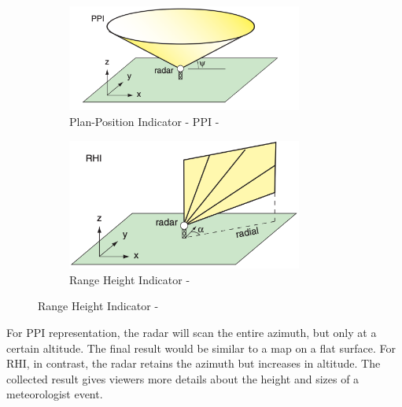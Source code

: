 \begin{figure}[htp!]
    \centering
    \begin{subfigure}{\textwidth}
        \centering
        \includegraphics[width=0.85\textwidth]{Images/2.1-ppi.png}
        \caption{Plan-Position Indicator - PPI - \cite{2022Weather}}
        \label{fig:ppi}
    \end{subfigure}

    \begin{subfigure}{\textwidth}
        \centering
        \includegraphics[width=0.85\textwidth]{Images/2.1-rhi.png}
        \caption{Range Height Indicator - \cite{2022Weather}}
        \label{fig:rhi}
    \end{subfigure}

\end{figure}

For PPI representation, the radar will scan the entire azimuth, but only at a certain altitude.
The final result would be similar to a map on a flat surface.
For RHI, in contrast, the radar retains the azimuth but increases in altitude.
The collected result gives viewers more details about the height and sizes of a meteorologist event.

